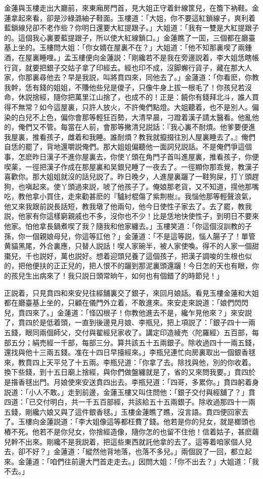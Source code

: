 金蓮與玉樓走出大廳前，來東廂房門首，見大姐正守着針線筐兒，在簷下衲鞋。金蓮拿起來看，卻是沙綠潞紬子鞋面。玉樓道：「大姐，你不要這紅鎖線子，爽利着藍鎖線兒卻不老作些？你明日還要大紅提跟子。」大姐道：「我有一雙是大紅提跟子的。這個我心裏要藍提跟子，所以使大紅線鎖口。」金蓮瞧了一囬，三個都在廳臺基上坐的。玉樓問大姐：「你女婿在屋裏不在？」大姐道：「他不知那裏喫了兩鍾酒，在屋裏睡哩。」孟玉樓便向金蓮説：「剛纔若不是我在旁邊説着，李大姐恁瞎帳行貨，就要把銀子交姑子拿了印經去。經也印不成，沒脚蠏行貨子，藏在那大人家，你那裏尋他去？早是我説，叫將賁四來，同他去了。」金蓮道：「你看麽，你教我幹，恁有錢的姐姐，不賺他些兒是儍子，只像牛身上拔一根毛了！你孩兒若沒命，休説捨經，隨你把萬里江山捨了，也成不的！正是：饒你有錢拜北斗，誰人買得不無常？如今這屋裏，只許人放火，不許俺們點燈。大姐聽着，也不是別人。偏染的白兒不上色，偏你會那等輕狂百勢，大清早晨，刁蹬着漢子請太醫看。他亂他的，俺們又不管。每當在人前，會那等撇清兒説話：『我心裏不耐煩。他爹要便進我屋裏，推看孩子，雌着和我睡。誰耐煩？教我就攛掇往別人屋裏睡去了。』俺們自恁的罷了，背地還嚼説俺們。那大姐姐偏聽他一面詞兒説話。不是俺們爭這個事，怎麽昨日漢子不進你屋裏去，你使丫頭在角門子首叫進屋裏，推看孩子，你便喫薬，一徑把漢子作成在那屋裏和吴銀兒睡了一夜去了。一徑顯你那乖覺，教漢子喜歡你。那大姐姐就沒的話兒説了。昨日晚夕，人進屋裏躧了一鞋狗屎，打丫頭趕狗，也嗔起來。使丫頭過來説，唬了他孩子了。俺娘那老貨，又不知道，㨪他那嘴吃，教他拿小買住，走來勸甚麽的『驢紂棍傷了紫荆樹』。我惱他那等輕聲浪氣，他又來我跟前説長話短，教我墩了他兩句，他今日使性子家去了。去了罷，教我説，他家有你這樣窮親戚也不多，沒你也不少！比是恁地快使性子，到明日不要來他家。怕他拿長鍋煮喫了我？隨我和他家纏去。」玉樓笑道：「你這個沒訓教的子孫，你一個親娘母兒，你這等訌他？」金蓮道：「不是這等説，惱人腸子了！單管黄貓黑尾，外合裏應，只替人説話！喫人家碗半，被人家使喚。得不的人家一個甜棗兒，千也説好，萬也説好。想着迎頭兒養了這個孩子，把漢子調唆的生根也似的，把他便扶的正正兒的，把人恨不的躧到那泥裏頭還躧！今日怎的天也有眼，你的孩兒生出病來了！我只説日頭常晌午，如何也有個錯了的時節兒！」

正説着，只見賁四和來安兒往經舖裏交了銀子，來回月娘話。看見玉樓金蓮和大姐都在廳臺基上坐的，只顧在儀門外立着，不敢進來。來安走來說道：「娘們閃閃兒，賁四來了。」金蓮道：「怪囚根子！你教他進去不是，纔乍見他來？」來安説了，賁四於是低着頭，一直到後邊見月娘、李瓶兒，把上項説了：「銀子四十一兩五錢，眼同兩個師父，交付與翟經兒家收了。講定印造綾売〈陀羅經〉五百部，每部五分；絹売經一千部，每部三分。算共該五十五兩銀子。除收過四十一兩五錢，還找與他十三兩五錢。准在十四日早擡經來。」李瓶兒連忙向房裏取出一個銀香毬來，教賁四上天平兑了十五兩。李瓶兒道：「你拿了去。除找與他，別的你收着。換下些錢，到十五日廟上捨經，與你們做盤纏就是了，省的又來問我要。」賁四於是揝香毬出門。月娘使來安送賁四出去。李瓶兒道：「四哥，多累你。」賁四躬着身説道：「小人不敢。」走到前邊，金蓮玉樓又叫住問他：「銀子交付與經舖了？」賁四道：「已交付明白，共一千五百部經，共該給五十五兩銀子。除收過那四十一兩五錢，剛纔六娘又與了這件銀香毬。」玉樓金蓮瞧了瞧，沒言語。賁四便回家去了。玉樓向金蓮説道：「李大姐像這等都枉費了錢。他若是你的兒女，就是榔頭也樁不死。他若不是你兒女，你捨經造像，隨你怎的也留不住他！信着姑子，甚麽繭兒幹不出來。剛纔不是我説着，把這些東西就託他拿的去了。這等着咱家個人兒去，卻不好？」金蓮道：「縱然他背地落，也落不多兒。」兩個説了一回，都立起來。金蓮道：「咱們往前邊大門首走走去。」因問大姐：「你不出去？」大姐道：「我不去。」

